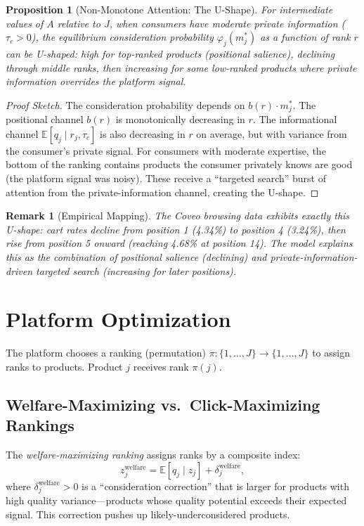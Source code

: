 \documentclass[12pt]{article}
\newtheorem{proposition}{Proposition}
\newtheorem{remark}{Remark}
\begin{document}
\begin{proposition}[Non-Monotone Attention: The U-Shape]\label{prop:ushape}
For intermediate values of $A$ relative to $J$, when consumers have moderate private information ($\tau_c > 0$), the equilibrium consideration probability $\varphi_j(m_j^*)$ as a function of rank $r$ can be U-shaped: high for top-ranked products (positional salience), declining through middle ranks, then increasing for some low-ranked products where private information overrides the platform signal.
\end{proposition}

\begin{proof}[Proof Sketch]
The consideration probability depends on $b(r) \cdot m_j^*$. The positional channel $b(r)$ is monotonically decreasing in $r$. The informational channel $\mathbb{E}[q_j \mid r_j, \tau_c]$ is also decreasing in $r$ on average, but with variance from the consumer's private signal. For consumers with moderate expertise, the bottom of the ranking contains products the consumer privately knows are good (the platform signal was noisy). These receive a ``targeted search'' burst of attention from the private-information channel, creating the U-shape.
\end{proof}

\begin{remark}[Empirical Mapping]
The Coveo browsing data exhibits exactly this U-shape: cart rates decline from position 1 (4.34\%) to position 4 (3.24\%), then rise from position 5 onward (reaching 4.68\% at position 14). The model explains this as the combination of positional salience (declining) and private-information-driven targeted search (increasing for later positions).
\end{remark}

\section{Platform Optimization}\label{sec:platform}

The platform chooses a ranking (permutation) $\pi: \{1,\dots,J\} \to \{1,\dots,J\}$ to assign ranks to products. Product $j$ receives rank $\pi(j)$.

\subsection{Welfare-Maximizing vs.\ Click-Maximizing Rankings}

The \emph{welfare-maximizing ranking} assigns ranks by a composite index:
\begin{equation}\label{eq:welfare_index}
    z_j^{\text{welfare}} = \mathbb{E}[q_j \mid z_j] + \delta_j^{\text{welfare}},
\end{equation}
where $\delta_j^{\text{welfare}} > 0$ is a ``consideration correction'' that is larger for products with high quality variance---products whose quality potential exceeds their expected signal. This correction pushes up likely-underconsidered products.
\end{document}
